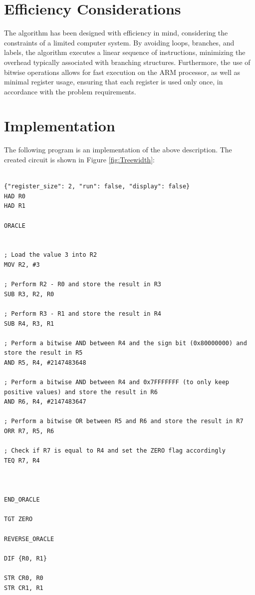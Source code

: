 \section{Efficiency Considerations}
The algorithm has been designed with efficiency in mind, considering the constraints of a limited computer system. By avoiding loops, branches, and labels, the algorithm executes a linear sequence of instructions, minimizing the overhead typically associated with branching structures. Furthermore, the use of bitwise operations allows for fast execution on the ARM processor, as well as minimal register usage, ensuring that each register is used only once, in accordance with the problem requirements.



\section{Implementation}

The following program is an implementation of the above description. The created circuit is shown in Figure \ref{fig:Treewidth}:

\begin{lstlisting}

{"register_size": 2, "run": false, "display": false}
HAD R0
HAD R1

ORACLE


; Load the value 3 into R2
MOV R2, #3

; Perform R2 - R0 and store the result in R3
SUB R3, R2, R0

; Perform R3 - R1 and store the result in R4
SUB R4, R3, R1

; Perform a bitwise AND between R4 and the sign bit (0x80000000) and store the result in R5
AND R5, R4, #2147483648

; Perform a bitwise AND between R4 and 0x7FFFFFFF (to only keep positive values) and store the result in R6
AND R6, R4, #2147483647

; Perform a bitwise OR between R5 and R6 and store the result in R7
ORR R7, R5, R6

; Check if R7 is equal to R4 and set the ZERO flag accordingly
TEQ R7, R4



END_ORACLE

TGT ZERO

REVERSE_ORACLE

DIF {R0, R1}

STR CR0, R0
STR CR1, R1


\end{lstlisting}


